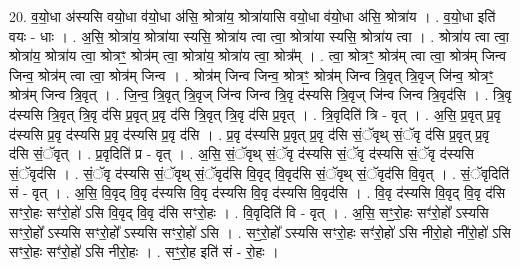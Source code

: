 \documentclass[17pt]{extarticle}
\begin{document}
20. व॒यो॒धा अ॑स्यसि वयो॒धा व॑यो॒धा अ॑सि॒ श्रोत्रा॑य॒ श्रोत्रा॑यासि वयो॒धा व॑यो॒धा अ॑सि॒ श्रोत्रा॑य । . व॒यो॒धा इति॑ वयः - धाः । . अ॒सि॒ श्रोत्रा॑य॒ श्रोत्रा॑या स्यसि॒ श्रोत्रा॑य त्वा त्वा॒ श्रोत्रा॑या स्यसि॒ श्रोत्रा॑य त्वा । . श्रोत्रा॑य त्वा त्वा॒ श्रोत्रा॑य॒ श्रोत्रा॑य त्वा॒ श्रोत्रꣳ॒॒ श्रोत्र॑म् त्वा॒ श्रोत्रा॑य॒ श्रोत्रा॑य त्वा॒ श्रोत्र᳚म् । . त्वा॒ श्रोत्रꣳ॒॒ श्रोत्र॑म् त्वा त्वा॒ श्रोत्र॑म् जिन्व जिन्व॒ श्रोत्र॑म् त्वा त्वा॒ श्रोत्र॑म् जिन्व । . श्रोत्र॑म् जिन्व जिन्व॒ श्रोत्रꣳ॒॒ श्रोत्र॑म् जिन्व त्रि॒वृत् त्रि॒वृज् जि॑न्व॒ श्रोत्रꣳ॒॒ श्रोत्र॑म् जिन्व त्रि॒वृत् । . जि॒न्व॒ त्रि॒वृत् त्रि॒वृज् जि॑न्व जिन्व त्रि॒वृ द॑स्यसि त्रि॒वृज् जि॑न्व जिन्व त्रि॒वृद॑सि । . त्रि॒वृ द॑स्यसि त्रि॒वृत् त्रि॒वृ द॑सि प्र॒वृत् प्र॒वृ द॑सि त्रि॒वृत् त्रि॒वृ द॑सि प्र॒वृत् । . त्रि॒वृदिति॑ त्रि - वृत् । . अ॒सि॒ प्र॒वृत् प्र॒वृ द॑स्यसि प्र॒वृ द॑स्यसि प्र॒वृ द॑स्यसि प्र॒वृ द॑सि । . प्र॒वृ द॑स्यसि प्र॒वृत् प्र॒वृ द॑सि सं॒ॅवृथ् सं॒ॅवृ द॑सि प्र॒वृत् प्र॒वृ द॑सि सं॒ॅवृत् । . प्र॒वृदिति॑ प्र - वृत् । . अ॒सि॒ सं॒ॅवृथ् सं॒ॅवृ द॑स्यसि सं॒ॅवृ द॑स्यसि सं॒ॅवृ द॑स्यसि सं॒ॅवृद॑सि । . सं॒ॅवृ द॑स्यसि सं॒ॅवृथ् सं॒ॅवृद॑सि वि॒वृद् वि॒वृद॑सि सं॒ॅवृथ् सं॒ॅवृद॑सि वि॒वृत् । . सं॒ॅवृदिति॑ सं - वृत् । . अ॒सि॒ वि॒वृद् वि॒वृ द॑स्यसि वि॒वृ द॑स्यसि वि॒वृ द॑स्यसि वि॒वृद॑सि । . वि॒वृ द॑स्यसि वि॒वृद् वि॒वृ द॑सि सꣳरो॒हः सꣳ॑रो॒हो॑ ऽसि वि॒वृद् वि॒वृ द॑सि सꣳरो॒हः । . वि॒वृदिति॑ वि - वृत् । . अ॒सि॒ सꣳ॒॒रो॒हः सꣳ॑रो॒हो᳚ ऽस्यसि सꣳरो॒हो᳚ ऽस्यसि सꣳरो॒हो᳚ ऽस्यसि सꣳरो॒हो॑ ऽसि । . सꣳ॒॒रो॒हो᳚ ऽस्यसि सꣳरो॒हः सꣳ॑रो॒हो॑ ऽसि नीरो॒हो नी॑रो॒हो॑ ऽसि सꣳरो॒हः सꣳ॑रो॒हो॑ ऽसि नीरो॒हः । . सꣳ॒॒रो॒ह इति॑ सं - रो॒हः । \newline
\end{document}
